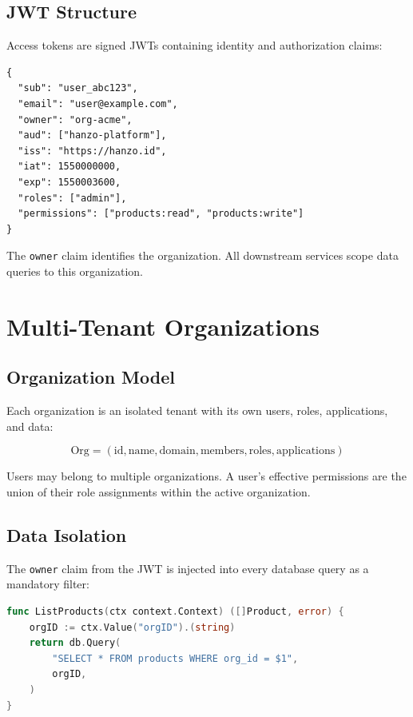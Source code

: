 \documentclass[11pt,a4paper]{article}
\begin{document}
\subsection{JWT Structure}

Access tokens are signed JWTs containing identity and authorization claims:

\begin{lstlisting}[caption=JWT payload structure.]
{
  "sub": "user_abc123",
  "email": "user@example.com",
  "owner": "org-acme",
  "aud": ["hanzo-platform"],
  "iss": "https://hanzo.id",
  "iat": 1550000000,
  "exp": 1550003600,
  "roles": ["admin"],
  "permissions": ["products:read", "products:write"]
}
\end{lstlisting}

The \texttt{owner} claim identifies the organization. All downstream services scope data queries to this organization.

\section{Multi-Tenant Organizations}

\subsection{Organization Model}

Each organization is an isolated tenant with its own users, roles, applications, and data:

\begin{equation}
    \text{Org} = (\text{id}, \text{name}, \text{domain}, \text{members}, \text{roles}, \text{applications})
\end{equation}

Users may belong to multiple organizations. A user's effective permissions are the union of their role assignments within the active organization.

\subsection{Data Isolation}

The \texttt{owner} claim from the JWT is injected into every database query as a mandatory filter:

\begin{lstlisting}[language=Go,caption=Org-scoped query pattern.]
func ListProducts(ctx context.Context) ([]Product, error) {
    orgID := ctx.Value("orgID").(string)
    return db.Query(
        "SELECT * FROM products WHERE org_id = $1",
        orgID,
    )
}
\end{lstlisting}
\end{document}
